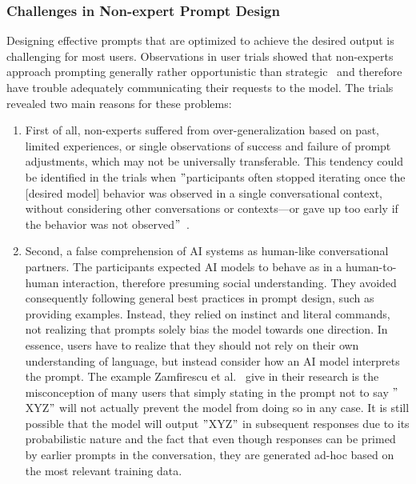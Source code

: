 \subsubsection{Challenges in Non-expert Prompt Design}
Designing effective prompts that are optimized to achieve the desired output is challenging for
most users.
Observations in user trials showed that non-experts approach prompting generally rather
opportunistic than strategic~\cite{zamfirescu-pereira_why_2023} and therefore have trouble
adequately communicating their requests to the model.
The trials revealed two main reasons for these problems:
\begin{enumerate}
    \item First of all, non-experts suffered from over-generalization based on past, limited experiences,
    or single observations of success and failure of prompt adjustments, which may not be universally
    transferable. %
    This tendency could be identified in the trials when \("\)participants often stopped iterating
    once the [desired model] behavior was observed in a single conversational context,
    without considering other conversations or contexts—or gave up too early
    if the behavior was not observed\("\)~\cite[p. 10]{zamfirescu-pereira_why_2023}.
    \item Second, a false comprehension of AI systems as human-like conversational partners.
    The participants expected AI models to behave as in a human-to-human interaction,
    therefore presuming social understanding.
    They avoided consequently following general best practices in prompt design, such as providing
    examples.
    Instead, they relied on instinct and literal commands, not realizing that prompts
    solely bias the model towards one direction.
    In essence, users have to realize that they should not rely on their own understanding of
    language, but instead consider how an AI model interprets the prompt.
    The example Zamfirescu et al\(.\)~\cite{zamfirescu-pereira_why_2023} give in their research
    is the misconception of many users that simply stating in the prompt not to say \("\)XYZ\("\)
    will not actually prevent the model from doing so in any case.
    It is still possible that the model will output \("\)XYZ\("\) in subsequent responses due to
    its probabilistic nature and the fact that even though responses can be primed
    by earlier prompts in the conversation, they are generated ad-hoc based on the most relevant
    training data.
\end{enumerate}

